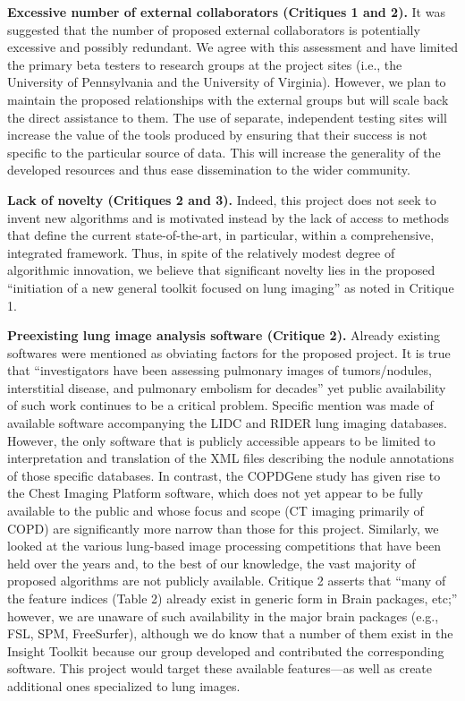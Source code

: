 \documentclass[11pt,]{article}
\begin{document}
\textbf{Excessive number of external collaborators (Critiques 1 and 2).}
It was suggested that the number of proposed external collaborators is
potentially excessive and possibly redundant. We agree with this
assessment and have limited the primary beta testers to research groups
at the project sites (i.e., the University of Pennsylvania and the
University of Virginia). However, we plan to maintain the proposed
relationships with the external groups but will scale back the direct
assistance to them. The use of separate, independent testing sites will
increase the value of the tools produced by ensuring that their success
is not specific to the particular source of data. This will increase the
generality of the developed resources and thus ease dissemination to the
wider community.

\textbf{Lack of novelty (Critiques 2 and 3).} Indeed, this project does
not seek to invent new algorithms and is motivated instead by the lack
of access to methods that define the current state-of-the-art, in
particular, within a comprehensive, integrated framework. Thus, in spite
of the relatively modest degree of algorithmic innovation, we believe
that significant novelty lies in the proposed ``initiation of a new
general toolkit focused on lung imaging'' as noted in Critique 1.

\textbf{Preexisting lung image analysis software (Critique 2).} Already
existing softwares were mentioned as obviating factors for the proposed
project. It is true that ``investigators have been assessing pulmonary
images of tumors/nodules, interstitial disease, and pulmonary embolism
for decades'' yet public availability of such work continues to be a
critical problem. Specific mention was made of available software
accompanying the LIDC and RIDER lung imaging databases. However, the
only software that is publicly accessible appears to be limited to
interpretation and translation of the XML files describing the nodule
annotations of those specific databases. In contrast, the COPDGene study
has given rise to the Chest Imaging Platform software, which does not
yet appear to be fully available to the public and whose focus and scope
(CT imaging primarily of COPD) are significantly more narrow than those
for this project. Similarly, we looked at the various lung-based image
processing competitions that have been held over the years and, to the
best of our knowledge, the vast majority of proposed algorithms are not
publicly available. Critique 2 asserts that ``many of the feature
indices (Table 2) already exist in generic form in Brain packages,
etc;'' however, we are unaware of such availability in the major brain
packages (e.g., FSL, SPM, FreeSurfer), although we do know that a number
of them exist in the Insight Toolkit because our group developed and
contributed the corresponding software. This project would target these
available features---as well as create additional ones specialized to
lung images.
\end{document}
